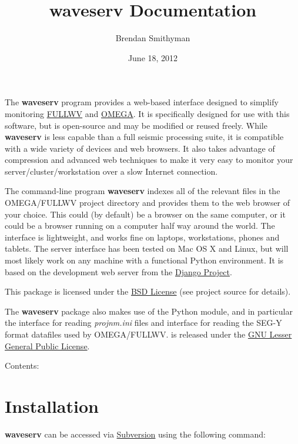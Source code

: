 \documentclass[letterpaper,10pt,english]{sphinxmanual}
\title{waveserv Documentation}
\date{June 18, 2012}
\author{Brendan Smithyman}
\begin{document}
\maketitle
\tableofcontents
{}\label{index::doc}


The \textbf{waveserv} program provides a web-based interface designed to simplify monitoring \href{http://orion.es.uwo.ca/index.php/FULLWV}{FULLWV} and \href{http://orion.es.uwo.ca/index.php/OMEGA}{OMEGA}.  It is specifically designed for use with this software, but is open-source and may be modified or reused freely.  While \textbf{waveserv} is less capable than a full seismic processing suite, it is compatible with a wide variety of devices and web browsers.  It also takes advantage of compression and advanced web techniques to make it very easy to monitor your server/cluster/workstation over a slow Internet connection.

The command-line program \textbf{waveserv} indexes all of the relevant files in the OMEGA/FULLWV project directory and provides them to the web browser of your choice.  This could (by default) be a browser on the same computer, or it could be a browser running on a computer half way around the world.  The interface is lightweight, and works fine on laptops, workstations, phones and tablets.  The server interface has been tested on Mac OS X and Linux, but will most likely work on any machine with a functional Python environment.  It is based on the development web server from the \href{http://www.djangoproject.com/}{Django Project}.

This package is licensed under the \href{http://www.opensource.org/licenses/BSD-3-Clause}{BSD License} (see project source for details).

The \textbf{waveserv} package also makes use of the  Python module, and in particular the  interface for reading \emph{projnm.ini} files and  interface for reading the SEG-Y format datafiles used by OMEGA/FULLWV.   is released under the \href{http://www.opensource.org/licenses/lgpl-3.0.html}{GNU Lesser General Public License}.

Contents:


\chapter{Installation}
\label{installation:introduction}\label{installation:installation}\label{installation:intro}\label{installation::doc}\label{installation:id1}
\textbf{waveserv} can be accessed via \href{http://subversion.apache.org/}{Subversion} using the following command:
\end{document}
